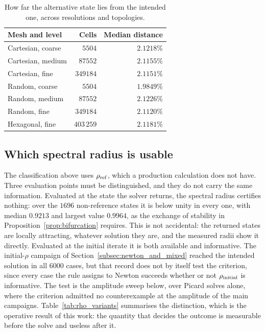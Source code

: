 \begin{table}[htb]
\centering
\caption{How far the alternative state lies from the intended one, across resolutions and topologies.}
\label{tab:branch_refinement}
\setlength{\tabcolsep}{7pt}
\begin{tabular}{lrr}
\toprule
\rowcolor{gray!12}
Mesh and level & Cells & Median distance \\
\midrule
Cartesian, coarse & $5504$ & $2.1218\%$ \\
Cartesian, medium & $87552$ & $2.1155\%$ \\
Cartesian, fine & $349184$ & $2.1151\%$ \\
\addlinespace[2pt]
Random, coarse & $5504$ & $1.9849\%$ \\
Random, medium & $87552$ & $2.1226\%$ \\
Random, fine & $349184$ & $2.1120\%$ \\
\addlinespace[2pt]
Hexagonal, fine & $403\,259$ & $2.1181\%$ \\
\bottomrule
\end{tabular}
\end{table}

\subsection{Which spectral radius is usable}
\label{subsec:which_rho}

The classification above uses $\rho_{\rm ref}$, which a production calculation does not have. Three evaluation points must be distinguished, and they do not carry the same information. Evaluated at the state the solver returns, the spectral radius certifies nothing: over the $1696$ non-reference states it is below unity in every one, with median $0.9213$ and largest value $0.9964$, as the exchange of stability in Proposition~\ref{prop:bifurcation} requires. This is not accidental: the returned states are locally attracting, whatever solution they are, and the measured radii show it directly. Evaluated at the initial iterate it is both available and informative. The initial-$\rho$ campaign of Section~\ref{subsec:newton_and_mixed} reached the intended solution in all $6000$ cases, but that record does not by itself test the criterion, since every case the rule assigns to Newton succeeds whether or not $\rho_{\rm initial}$ is informative. The test is the amplitude sweep below, over Picard solves alone, where the criterion admitted no counterexample at the amplitude of the main campaigns. Table~\ref{tab:rho_variants} summarises the distinction, which is the operative result of this work: the quantity that decides the outcome is measurable before the solve and useless after it.

